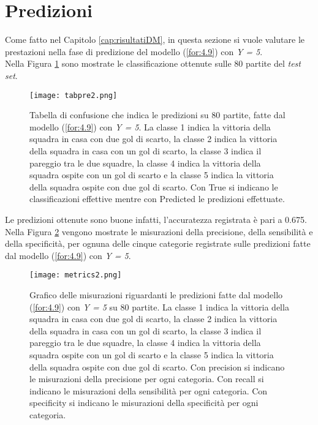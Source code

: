 \section{Predizioni}
Come fatto nel Capitolo \ref{cap:risultatiDM}, in questa sezione si vuole valutare le prestazioni nella fase di predizione del modello (\ref{for:4.9}) con \emph{Y = 5}.\\
Nella Figura \ref{fig:pre2} sono mostrate le classificazione ottenute sulle 80 partite del \emph{test set}.
\begin{figure}[h]
	\begin{center}
		\texttt{[image: tabpre2.png]}
		\caption{Tabella di confusione che indica le predizioni su 80 partite, fatte dal modello (\ref{for:4.9}) con \emph{Y = 5}. La classe 1 indica la vittoria della squadra in casa con due gol di scarto, la classe 2 indica la vittoria della squadra in casa con un gol di scarto, la classe 3 indica il pareggio tra le due squadre, la classe 4 indica la vittoria della squadra ospite con un gol di scarto e la classe 5 indica la vittoria della squadra ospite con due gol di scarto. Con \textsf{True} si indicano le classificazioni effettive mentre con \textsf{Predicted} le predizioni effettuate.}\label{fig:pre2}
	\end{center}
\end{figure}
Le predizioni ottenute sono buone infatti, l'accuratezza registrata è pari a 0.675. Nella Figura \ref{fig:metrics} vengono mostrate le misurazioni della precisione, della sensibilità e della specificità, per ognuna delle cinque categorie registrate sulle predizioni fatte dal modello (\ref{for:4.9}) con \emph{Y = 5}.
\begin{figure}[]
	\begin{center}
		\texttt{[image: metrics2.png]}
		\caption{Grafico delle misurazioni riguardanti le predizioni fatte dal modello (\ref{for:4.9}) con \emph{Y = 5} su 80 partite. La classe 1 indica la vittoria della squadra in casa con due gol di scarto, la classe 2 indica la vittoria della squadra in casa con un gol di scarto, la classe 3 indica il pareggio tra le due squadre, la classe 4 indica la vittoria della squadra ospite con un gol di scarto e la classe 5 indica la vittoria della squadra ospite con due gol di scarto. Con \textsf{precision} si indicano le misurazioni della precisione per ogni categoria. Con \textsf{recall} si indicano le misurazioni della sensibilità per ogni categoria. Con \textsf{specificity} si indicano le misurazioni della specificità per ogni categoria.}\label{fig:metrics}
	\end{center}
\end{figure}
